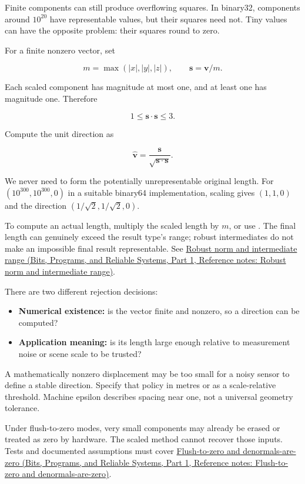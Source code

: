 \hypertarget{01-foundations-i-ch017-scale-first-then-measure}{}

Finite components can still produce overflowing squares. In binary32, components around \(10^{20}\) have representable values, but their squares need not. Tiny values can have the opposite problem: their squares round to zero.

For a finite nonzero vector, set

\[
m=\max(|x|,|y|,|z|),\qquad
\mathbf s=\mathbf v/m.
\]

Each scaled component has magnitude at most one, and at least one has magnitude one. Therefore

\[
1\le\mathbf s\cdot\mathbf s\le3.
\]

Compute the unit direction as

\[
\widehat{\mathbf v}=\frac{\mathbf s}{\sqrt{\mathbf s\cdot\mathbf s}}.
\]

We never need to form the potentially unrepresentable original length. For \((10^{300},10^{300},0)\) in a suitable binary64 implementation, scaling gives \((1,1,0)\) and the direction \((1/\sqrt2,1/\sqrt2,0)\).

To compute an actual length, multiply the scaled length by \(m\), or use . The final length can genuinely exceed the result type's range; robust intermediates do not make an impossible final result representable. See \href{../01-Bits-Programs-and-Reliable-Systems-P01/main.pdf\#nameddest=appendix-7f1e17dcafb1}{Robust norm and intermediate range (Bits, Programs, and Reliable Systems, Part 1, Reference notes: Robust norm and intermediate range)}.

There are two different rejection decisions:

\begin{itemize}
\tightlist
\item
  \textbf{Numerical existence:} is the vector finite and nonzero, so a direction can be computed?
\item
  \textbf{Application meaning:} is its length large enough relative to measurement noise or scene scale to be trusted?
\end{itemize}

A mathematically nonzero displacement may be too small for a noisy sensor to define a stable direction. Specify that policy in metres or as a scale-relative threshold. Machine epsilon describes spacing near one, not a universal geometry tolerance.

Under flush-to-zero modes, very small components may already be erased or treated as zero by hardware. The scaled method cannot recover those inputs. Tests and documented assumptions must cover \href{../01-Bits-Programs-and-Reliable-Systems-P01/main.pdf\#nameddest=appendix-e979eb012782}{Flush-to-zero and denormals-are-zero (Bits, Programs, and Reliable Systems, Part 1, Reference notes: Flush-to-zero and denormals-are-zero)}.

